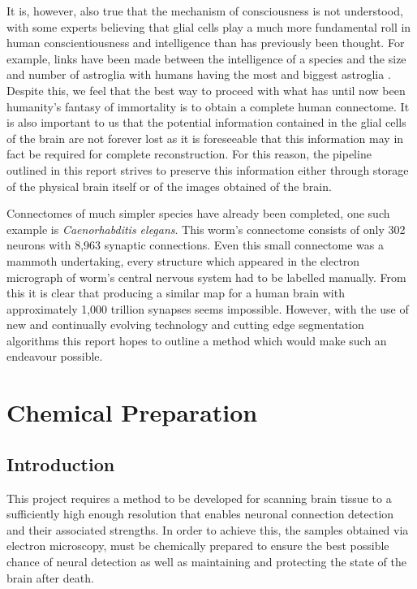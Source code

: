\documentclass[a4paper, 11pt]{article}
\numberwithin{equation}{section}
\begin{document}
It is, however, also true that the mechanism of consciousness is not understood, with some experts believing that glial cells play a much more fundamental roll in human conscientiousness and intelligence than has previously been thought. For example, links have been made between the intelligence of a species and the size and number of astroglia with humans having the most and biggest astroglia \cite{koob2009root}. Despite this, we feel that the best way to proceed with what has until now been humanity's fantasy of immortality is to obtain a complete human connectome. It is also important to us that the potential information contained in the glial cells of the brain are not forever lost as it is foreseeable that this information may in fact be required for complete reconstruction. For this reason, the pipeline outlined in this report strives to preserve this information either through storage of the physical brain itself or of the images obtained of the brain.

Connectomes of much simpler species have already been completed, one such example is \textit{Caenorhabditis elegans}. This worm's connectome consists of only 302 neurons with 8,963 synaptic connections\cite{varshney2011structural}. Even this small connectome was a mammoth undertaking, every structure which appeared in the electron micrograph of worm's central nervous system had to be labelled manually. From this it is clear that producing a similar map for a human brain with approximately 1,000 trillion synapses %
seems impossible. However, with the use of new and continually evolving technology and cutting edge segmentation algorithms this report hopes to outline a method which would make such an endeavour possible.  


\newpage

\clearpage

\pagestyle{alex}

\section{Chemical Preparation}
\subsection{Introduction}

This project requires a method to be developed for scanning brain tissue to a sufficiently high enough resolution that enables neuronal connection detection and their associated strengths. In order to achieve this, the samples obtained via electron microscopy, must be chemically prepared to ensure the best possible chance of neural detection as well as maintaining and protecting the state of the brain after death. 
\end{document}
